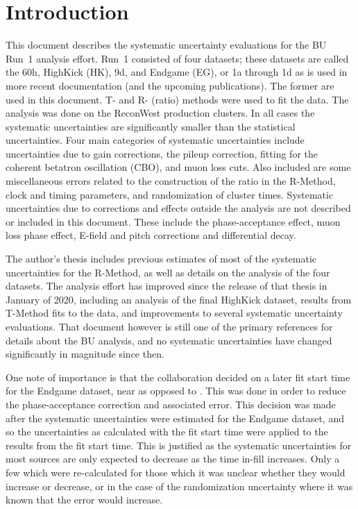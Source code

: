 
\graphicspath{}

\section{Introduction}


This document describes the systematic uncertainty evaluations for the BU Run~1 \wa analysis effort. Run~1 consisted of four datasets; these datasets are called the 60h, HighKick (HK), 9d, and Endgame (EG), or 1a through 1d as is used in more recent documentation (and the upcoming publications). The former are used in this document. T- and R- (ratio) methods were used to fit the data. The analysis was done on the ReconWest production clusters. In all cases the systematic uncertainties are significantly smaller than the statistical uncertainties. Four main categories of systematic uncertainties include uncertainties due to gain corrections, the pileup correction, fitting for the coherent betatron oscillation (CBO), and muon loss cuts. Also included are some miscellaneous errors related to the construction of the ratio in the R-Method, clock and timing parameters, and randomization of cluster times. Systematic uncertainties due to corrections and effects outside the \wa analysis are not described or included in this document. These include the phase-acceptance effect, muon loss phase effect, E-field and pitch corrections and differential decay.

The author's thesis \cite{phdthesis:2020Kinnaird} includes previous estimates of most of the systematic uncertainties for the R-Method, as well as details on the analysis of the four datasets. The analysis effort has improved since the release of that thesis in January of 2020, including an analysis of the final HighKick dataset, results from T-Method fits to the data, and improvements to several systematic uncertainty evaluations. That document however is still one of the primary references for details about the BU \wa analysis, and no systematic uncertainties have changed significantly in magnitude since then.

One note of importance is that the collaboration decided on a later fit start time for the Endgame dataset, near  as opposed to . This was done in order to reduce the phase-acceptance correction and associated error. This decision was made after the systematic uncertainties were estimated for the Endgame dataset, and so the uncertainties as calculated with the  fit start time were applied to the results from the  fit start time. This is justified as the systematic uncertainties for most sources are only expected to decrease as the time in-fill increases. Only a few which were re-calculated for those which it was unclear whether they would increase or decrease, or in the case of the randomization uncertainty where it was known that the error would increase.

